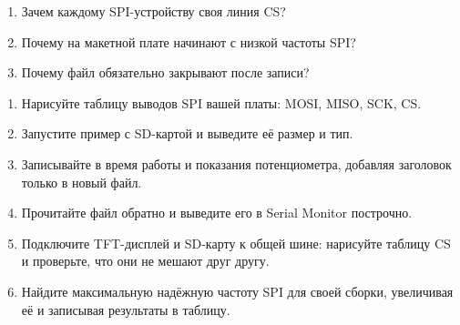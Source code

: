 \begin{selfcheck}
\begin{enumerate}
  \item Зачем каждому SPI-устройству своя линия CS?
  \item Почему на макетной плате начинают с низкой частоты SPI?
  \item Почему файл обязательно закрывают после записи?
\end{enumerate}
\end{selfcheck}

\begin{tasks}
\begin{enumerate}
\item {} Нарисуйте таблицу выводов SPI вашей платы: MOSI, MISO, SCK, CS.
\item {} Запустите пример с SD-картой и выведите её размер и тип.
\item {} Записывайте в  время работы и показания потенциометра, добавляя заголовок только в новый файл.
\item {} Прочитайте файл обратно и выведите его в Serial Monitor построчно.
\item {} Подключите TFT-дисплей и SD-карту к общей шине: нарисуйте таблицу CS и проверьте, что они не мешают друг другу.
\item {} Найдите максимальную надёжную частоту SPI для своей сборки, увеличивая её и записывая результаты в таблицу.
\end{enumerate}
\end{tasks}
